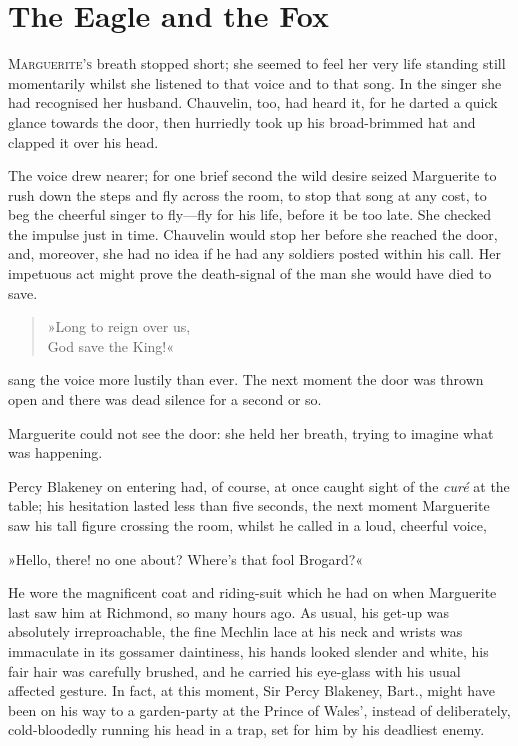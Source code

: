 
\chapter{The Eagle and the Fox}
\lettrine[lines=4]{M}{arguerite's} breath stopped short; she seemed to feel her very life standing still momentarily whilst she listened to that voice and to that song. In the singer she had recognised her husband. Chauvelin, too, had heard it, for he darted a quick glance towards the door, then hurriedly took up his broad-brimmed hat and clapped it over his head.

The voice drew nearer; for one brief second the wild desire seized Marguerite to rush down the steps and fly across the room, to stop that song at any cost, to beg the cheerful singer to fly—fly for his life, before it be too late. She checked the impulse just in time. Chauvelin would stop her before she reached the door, and, moreover, she had no idea if he had any soldiers posted within his call. Her impetuous act might prove the death-signal of the man she would have died to save.

\blockquote{
»Long to reign over us,\\
God save the King!«
}

sang the voice more lustily than ever. The next moment the door was thrown open and there was dead silence for a second or so.

Marguerite could not see the door: she held her breath, trying to imagine what was happening.

Percy Blakeney on entering had, of course, at once caught sight of the \textit{curé} at the table; his hesitation lasted less than five seconds, the next moment Marguerite saw his tall figure crossing the room, whilst he called in a loud, cheerful voice,\longdash


»Hello, there! no one about? Where's that fool Brogard?«

He wore the magnificent coat and riding-suit which he had on when Marguerite last saw him at Richmond, so many hours ago. As usual, his get-up was absolutely irreproachable, the fine Mechlin lace at his neck and wrists was immaculate in its gossamer daintiness, his hands looked slender and white, his fair hair was carefully brushed, and he carried his eye-glass with his usual affected gesture. In fact, at this moment, Sir Percy Blakeney, Bart., might have been on his way to a garden-party at the Prince of Wales', instead of deliberately, cold-bloodedly running his head in a trap, set for him by his deadliest enemy.

